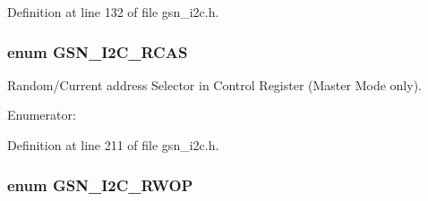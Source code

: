 Definition at line 132 of file gsn\_\-i2c.h.

\hypertarget{a00649_ga714a31fb514e9a5d07a62aadef7cc5f8}{
\subsubsection[{GSN\_\-I2C\_\-RCAS}]{\setlength{\rightskip}{0pt plus 5cm}enum {\bf GSN\_\-I2C\_\-RCAS}}}
\label{a00649_ga714a31fb514e9a5d07a62aadef7cc5f8}


Random/Current address Selector in Control Register (Master Mode only). 

\begin{Desc}
\item[Enumerator: ]\par
\begin{description}
\item[{\em 
\hypertarget{a00649_gga714a31fb514e9a5d07a62aadef7cc5f8a190230ad2a9fc15dfc59234aa3f2b498}{
GSN\_\-I2C\_\-RCAS\_\-CURRENTADD}
\label{a00649_gga714a31fb514e9a5d07a62aadef7cc5f8a190230ad2a9fc15dfc59234aa3f2b498}
}]\item[{\em 
\hypertarget{a00649_gga714a31fb514e9a5d07a62aadef7cc5f8a76baa362b7df91bb133cbe4ff24fdb1f}{
GSN\_\-I2C\_\-RCAS\_\-RANDOMADD}
\label{a00649_gga714a31fb514e9a5d07a62aadef7cc5f8a76baa362b7df91bb133cbe4ff24fdb1f}
}]\end{description}
\end{Desc}



Definition at line 211 of file gsn\_\-i2c.h.

\hypertarget{a00649_ga67da6f46815f1aaf8cf6e1a35b13a02c}{
\subsubsection[{GSN\_\-I2C\_\-RWOP}]{\setlength{\rightskip}{0pt plus 5cm}enum {\bf GSN\_\-I2C\_\-RWOP}}}
\label{a00649_ga67da6f46815f1aaf8cf6e1a35b13a02c}


